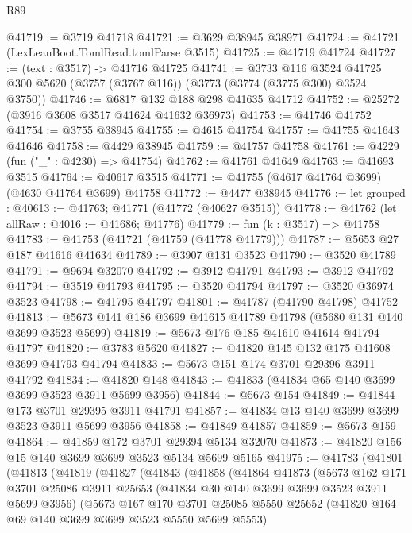 \begin{lexlean}{R89}
\begin{coremodule}
@41719 := @3719 @41718
@41721 := @3629 @38945 @38971
@41724 := @41721 (LexLeanBoot.TomlRead.tomlParse @3515)
@41725 := @41719 @41724
@41727 := (text : @3517) -> @41716 @41725
@41741 := @3733
    @116
    @3524
    @41725
    @300
    @5620
    (@3757 (@3767 @116))
    (@3773 (@3774 (@3775 @300) @3524 @3750))
@41746 := @6817 @132 @188 @298 @41635 @41712
@41752 := @25272 (@3916 @3608 @3517 @41624 @41632 @36973)
@41753 := @41746 @41752
@41754 := @3755 @38945
@41755 := @4615 @41754
@41757 := @41755 @41643 @41646
@41758 := @4429 @38945
@41759 := @41757 @41758
@41761 := @4229 (fun ("_" : @4230) => @41754)
@41762 := @41761 @41649
@41763 := @41693 @3515
@41764 := @40617 @3515
@41771 := @41755 (@4617 @41764 @3699) (@4630 @41764 @3699) @41758
@41772 := @4477 @38945
@41776 := let grouped : @40613 := @41763; @41771 (@41772 (@40627 @3515))
@41778 := @41762 (let allRaw : @4016 := @41686; @41776)
@41779 := fun (k : @3517) => @41758
@41783 := @41753 (@41721 (@41759 (@41778 @41779)))
@41787 := @5653 @27 @187 @41616 @41634
@41789 := @3907 @131 @3523
@41790 := @3520 @41789
@41791 := @9694 @32070
@41792 := @3912 @41791
@41793 := @3912 @41792
@41794 := @3519 @41793
@41795 := @3520 @41794
@41797 := @3520 @36974 @3523
@41798 := @41795 @41797
@41801 := @41787 (@41790 @41798) @41752
@41813 := @5673 @141 @186 @3699 @41615 @41789 @41798 (@5680 @131 @140 @3699 @3523 @5699)
@41819 := @5673 @176 @185 @41610 @41614 @41794 @41797
@41820 := @3783 @5620
@41827 := @41820 @145 @132 @175 @41608 @3699 @41793 @41794
@41833 := @5673 @151 @174 @3701 @29396 @3911 @41792
@41834 := @41820 @148
@41843 := @41833 (@41834 @65 @140 @3699 @3699 @3523 @3911 @5699 @3956)
@41844 := @5673 @154
@41849 := @41844 @173 @3701 @29395 @3911 @41791
@41857 := @41834 @13 @140 @3699 @3699 @3523 @3911 @5699 @3956
@41858 := @41849 @41857
@41859 := @5673 @159
@41864 := @41859 @172 @3701 @29394 @5134 @32070
@41873 := @41820 @156 @15 @140 @3699 @3699 @3523 @5134 @5699 @5165
@41975 := @41783
    (@41801
      (@41813
        (@41819
          (@41827
            (@41843
              (@41858
                (@41864
                  @41873
                  (@5673
                    @162
                    @171
                    @3701
                    @25086
                    @3911
                    @25653
                    (@41834 @30 @140 @3699 @3699 @3523 @3911 @5699 @3956)
                    (@5673
                      @167
                      @170
                      @3701
                      @25085
                      @5550
                      @25652
                      (@41820 @164 @69 @140 @3699 @3699 @3523 @5550 @5699 @5553)

\end{coremodule}
\end{lexlean}
